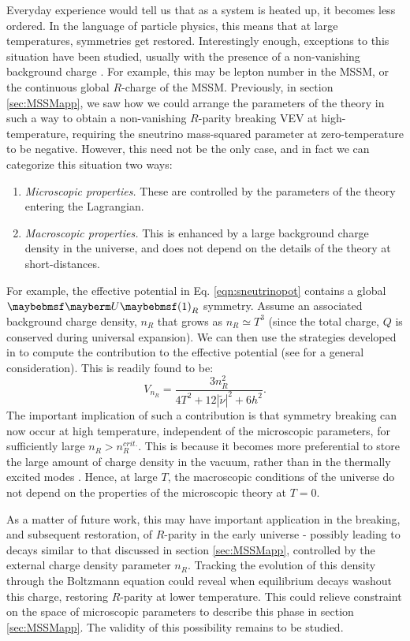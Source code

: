Everyday experience would tell us that as a system is heated up, it becomes less ordered. In the language of particle physics, this means that at large temperatures, symmetries get restored. Interestingly enough, exceptions to this situation have been studied, usually with the presence of a non-vanishing background charge \cite{RN788,RN797,RN792,RN798}. For example, this may be lepton number in the MSSM, or the continuous global $R$-charge of the MSSM. Previously, in section \ref{sec:MSSMapp}, we saw how we could arrange the parameters of the theory in such a way to obtain a non-vanishing $R$-parity breaking VEV at high-temperature, requiring the sneutrino mass-squared parameter at zero-temperature to be negative. However, this need not be the only case, and in fact we can categorize this situation two ways:
\begin{enumerate}[label=(\Alph*)]
	\item \textit{Microscopic properties.} These are controlled by the parameters of the theory entering the Lagrangian.
	\item \textit{Macroscopic properties.} This is enhanced by a large background charge density in the universe, and does not depend on the details of the theory at short-distances.
\end{enumerate}
For example, the effective potential in Eq. \ref{eqn:sneutrinopot} contains a global $\Ugroup{1}_R$ symmetry. Assume an associated background charge density, $n_R$ that grows as $n_R \simeq T^3$ (since the total charge, $Q$ is conserved during universal expansion). We can then use the strategies developed in \cite{RN794,RN795,RN796} to compute the contribution to the effective potential (see \cite{RN792} for a general consideration). This is readily found to be:
\begin{equation}
V_{n_R}=\frac{3n^2_R}{4T^2+12|\tilde{\nu}|^2+6h^2}.
\end{equation}
The important implication of such a contribution is that symmetry breaking can now occur at high temperature, independent of the microscopic parameters, for sufficiently large $n_R > n^{crit.}_R$. This is because it becomes more preferential to store the large amount of charge density in the vacuum, rather than in the thermally excited modes \cite{RN789}. Hence, at large $T$, the macroscopic conditions of the universe do not depend on the properties of the microscopic theory at $T=0$.

As a matter of future work, this may have important application in the breaking, and subsequent restoration, of $R$-parity in the early universe - possibly leading to decays similar to that discussed in section \ref{sec:MSSMapp}, controlled by the external charge density parameter $n_R$. Tracking the evolution of this density through the Boltzmann equation could reveal when equilibrium decays washout this charge, restoring $R$-parity at lower temperature. This could relieve constraint on the space of microscopic parameters to describe this phase in section \ref{sec:MSSMapp}. The validity of this possibility remains to be studied.

